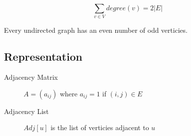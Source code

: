 \documentclass{article}
\begin{document}
\begin{equation*}
    \sum_{v \in V} degree(v) = 2|E|
\end{equation*}

Every undirected graph has an even number of odd verticies.

\subsection*{Representation}

\begin{description}
    \item[Adjacency Matrix]  \(A = (a_{ij})\) where \(a_{ij} = 1\) if \((i, j) \in E\)
    \item[Adjacency List]  \(Adj[u]\) is the list of verticies adjacent to \(u\)
\end{description}
\end{document}

